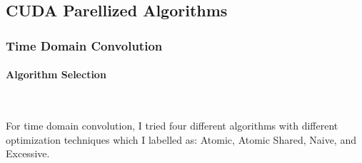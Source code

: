 \subsection{CUDA Parellized Algorithms}
\subsubsection{Time Domain Convolution}
\paragraph{Algorithm Selection} \hspace{0pt} \\
\indent \par For time domain convolution, I tried four different algorithms with different optimization techniques which I labelled as: Atomic, Atomic Shared, Naive, and Excessive.


